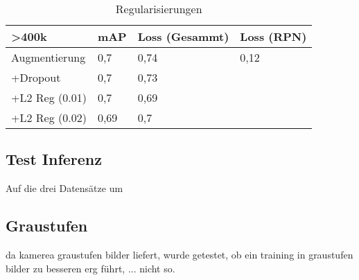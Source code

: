 \begin{table}[htb]
  \centering
  \label{table:reg}
  \begin{tabular}{m{}|m{}<{\centering}m{}<{\centering}m{}<{\centering}}
  \hline
  \textgreater 400k & mAP  & Loss (Gesammt) & Loss (RPN) \\ \hline\hline
  Augmentierung     & 0,7  & 0,74           &  0,12          \\
  +Dropout          & 0,7  & 0,73           &            \\
  +L2 Reg (0.01)    & 0,7  & 0,69           &            \\
  +L2 Reg (0.02)    & 0,69 & 0,7            &            \\ \hline
  \end{tabular}
  \caption{Regularisierungen}
\end{table}

\subsection{Test Inferenz}

Auf die drei Datensätze um 


\subsection{Graustufen}
da kamerea graustufen bilder liefert, wurde getestet, ob ein 
training in graustufen bilder zu besseren erg führt, ... nicht so.








